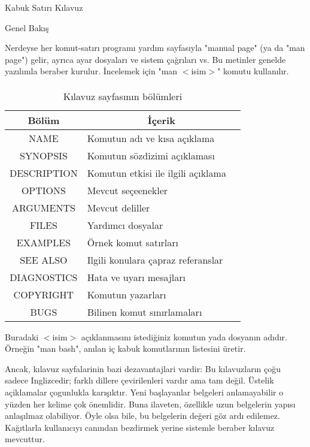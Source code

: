 \documentclass[10pt,a5paper]{book}
\begin{document}
\begin{section}{Kabuk Satırı Kılavuz}
\begin{subsection}{Genel Bakış}

Nerdeyse her komut-satırı programı yardım sayfasıyla "manual page" (ya da "man page") gelir, ayrıca ayar dosyaları ve sistem çağrıları vs. Bu metinler 
genelde yazılımla beraber kurulur. İncelemek için "man $<$isim$>$" komutu kullanılır.

\paragraph{}{
\begin {table}[H]
\caption {Kılavuz sayfasının bölümleri} \label{tab:title} 
\begin{tabular}{c l @{} l}
\hline
Bölüm &
\multicolumn{2}{c}{İçerik} \\
\hline
NAME 	&	Komutun adı ve kısa açıklama \\
SYNOPSIS &	Komutun sözdizimi açıklaması \\
DESCRIPTION &	Komutun etkisi ile ilgili açıklama \\
OPTIONS &	Mevcut seçeenekler \\
ARGUMENTS &	Mevcut deliller \\
FILES 	&	Yardımcı dosyalar \\
EXAMPLES &	Örnek komut satırları \\
SEE ALSO &	Ilgili konulara çapraz referanslar \\
DIAGNOSTICS &	Hata ve uyarı mesajları \\
COPYRIGHT & 	Komutun yazarları \\
BUGS	&	Bilinen komut sınırlamaları \\
\hline
\end{tabular}
\end {table}
}

Buradaki $<$isim$>$ açıklanmasını istediğiniz komutun yada dosyanın adıdır. Örneğin "man bash", anılan iç kabuk komutlarının listesini üretir.

Ancak, kılavuz sayfalarinin bazi dezavantajlari vardir: Bu kılavuzların çoğu sadece Inglizcedir; farklı dillere çevirilenleri vardır ama tam değil. Üstelik açiklamalar çogunlukla karışıktır. Yeni başlayanlar belgeleri anlamayabilir o yüzden her kelime çok önemlidir. Buna ilaveten, özellikle uzun belgelerin yapısı anlaşılmaz olabiliyor. Öyle olsa bile, bu belgelerin değeri göz ardı edilemez. Kağıtlarla kullanıcıyı canından bezdirmek yerine sistemle beraber kılavuz mevcuttur.


\end{subsection}
\end{section}
\end{document}

